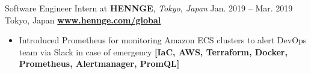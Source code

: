 \cveventflat
{Software Engineer Intern at }
{\textbf{HENNGE}, \textit{Tokyo, Japan}}
{Jan. 2019 -- Mar. 2019}
{Tokyo, Japan}
\newline
\href{https://hennge.com/global/}{\textbf{www.hennge.com/global}}
\begin{itemize}
    \item Introduced Prometheus for monitoring Amazon ECS clusters to alert DevOps team via Slack in case of emergency
    \textbf{[IaC, AWS, Terraform, Docker, Prometheus, Alertmanager, PromQL]}
\end{itemize}
